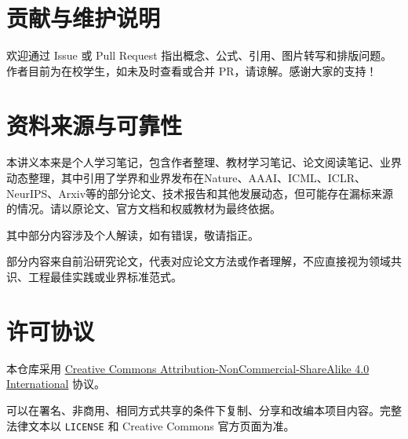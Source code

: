 \hypertarget{ux8d21ux732eux4e0eux7ef4ux62a4ux8bf4ux660e}{%
\section{贡献与维护说明}\label{ux8d21ux732eux4e0eux7ef4ux62a4ux8bf4ux660e}}

欢迎通过 Issue 或 Pull Request 指出概念、公式、引用、图片转写和排版问题。作者目前为在校学生，如未及时查看或合并 PR，请谅解。感谢大家的支持！

\hypertarget{ux8d44ux6599ux6765ux6e90ux4e0eux53efux9760ux6027}{%
\section{资料来源与可靠性}\label{ux8d44ux6599ux6765ux6e90ux4e0eux53efux9760ux6027}}

本讲义本来是个人学习笔记，包含作者整理、教材学习笔记、论文阅读笔记、业界动态整理，其中引用了学界和业界发布在Nature、AAAI、ICML、ICLR、NeurIPS、Arxiv等的部分论文、技术报告和其他发展动态，但可能存在漏标来源的情况。请以原论文、官方文档和权威教材为最终依据。

其中部分内容涉及个人解读，如有错误，敬请指正。

部分内容来自前沿研究论文，代表对应论文方法或作者理解，不应直接视为领域共识、工程最佳实践或业界标准范式。

\hypertarget{ux8bb8ux53efux534fux8bae}{%
\section{许可协议}\label{ux8bb8ux53efux534fux8bae}}

本仓库采用 \href{https://creativecommons.org/licenses/by-nc-sa/4.0/}{Creative Commons Attribution-NonCommercial-ShareAlike 4.0 International} 协议。

可以在署名、非商用、相同方式共享的条件下复制、分享和改编本项目内容。完整法律文本以 \texttt{LICENSE} 和 Creative Commons 官方页面为准。

\clearpage
